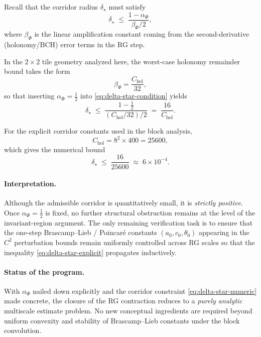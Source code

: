 \documentclass[11pt]{article}
\theoremstyle{definition}
\newcommand{\1}{\mathbf{1}}
\begin{document}
Recall that the corridor radius $\delta_\star$ must satisfy
\begin{equation}\label{eq:delta-star-condition}
\delta_\star \;\le\; \frac{1-\alpha_\Phi}{\beta_\Phi/2},
\end{equation}
where $\beta_\Phi$ is the linear amplification constant coming from the second-derivative (holonomy/BCH) error terms in the RG step.

In the $2\times2$ tile geometry analyzed here, the worst-case holonomy remainder bound takes the form
\begin{equation}\label{eq:betaPhi}
\beta_\Phi = \frac{C_{\mathrm{hol}}}{32},
\end{equation}
so that inserting $\alpha_\Phi=\tfrac12$ into \eqref{eq:delta-star-condition} yields
\begin{equation}\label{eq:delta-star-explicit}
\delta_\star \;\le\;
\frac{1-\tfrac12}{(C_{\mathrm{hol}}/32)/2}
\;=\;
\frac{16}{C_{\mathrm{hol}}}.
\end{equation}

For the explicit corridor constants used in the block analysis,
\begin{equation}\label{eq:Chol-value}
C_{\mathrm{hol}} = 8^2 \times 400 = 25600,
\end{equation}
which gives the numerical bound
\begin{equation}\label{eq:delta-star-numeric}
\delta_\star \;\le\; \frac{16}{25600} \;\approx\; 6\times 10^{-4}.
\end{equation}

\paragraph{Interpretation.}
Although the admissible corridor is quantitatively small, it is \emph{strictly positive}. Once $\alpha_\Phi=\tfrac12$ is fixed, no further structural obstruction remains at the level of the invariant-region argument. The only remaining verification task is to ensure that the one-step Brascamp--Lieb / Poincar\'e constants $(a_0,c_0,\theta_0)$ appearing in the $C^2$ perturbation bounds remain uniformly controlled across RG scales so that the inequality \eqref{eq:delta-star-explicit} propagates inductively.

\paragraph{Status of the program.}
With $\alpha_\Phi$ nailed down explicitly and the corridor constraint \eqref{eq:delta-star-numeric} made concrete, the closure of the RG contraction reduces to a \emph{purely analytic} multiscale estimate problem. No new conceptual ingredients are required beyond uniform convexity and stability of Brascamp--Lieb constants under the block convolution.
\end{document}
